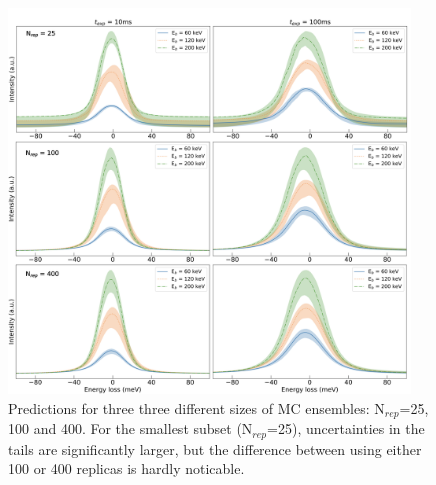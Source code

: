 \begin{figure}[H]
\centering
 \includegraphics[width=0.95\textwidth]{plots/Prediction_120keV_different_nrep.pdf}
 \caption{Predictions for three three different sizes of MC ensembles:
N$_{rep}$=25, 100 and 400. For the smallest subset (N$_{rep}$=25), 
uncertainties in the tails are significantly larger, but
the difference between using either 100 or 400 replicas is hardly noticable.
}
\label{fig:EELS_vacuum_DeltaE_check3}
\end{figure}



